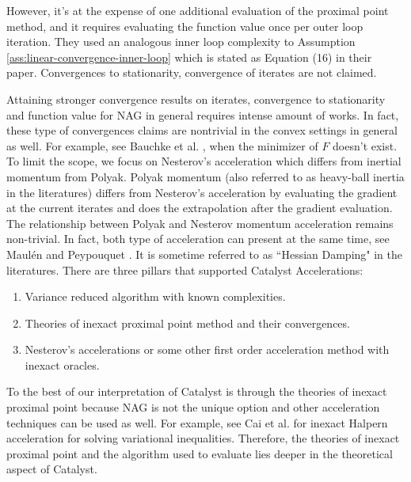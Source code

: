\documentclass[12pt]{article}
\begin{document}
            However, it's at the expense of one additional evaluation of the proximal point method, and it requires evaluating the function value once per outer loop iteration. 
            They used an analogous inner loop complexity to Assumption \ref{ass:linear-convergence-inner-loop} which is stated as Equation (16) in their paper. 
            Convergences to stationarity, convergence of iterates are not claimed. 
            \par
            Attaining stronger convergence results on iterates, convergence to stationarity and function value for NAG in general requires intense amount of works. 
            In fact, these type of convergences claims are nontrivial in the convex settings in general as well. 
            For example, see Bauchke et al. \cite{bauschke_applying_2020}, when the minimizer of $F$ doesn't exist. 
            To limit the scope, we focus on Nesterov's acceleration which differs from inertial momentum from Polyak.
            Polyak momentum (also referred to as heavy-ball inertia in the literatures) differs from Nesterov's acceleration by evaluating the gradient at the current iterates and does the extrapolation after the gradient evaluation. 
            The relationship between Polyak and Nesterov momentum acceleration remains non-trivial. 
            In fact, both type of acceleration can present at the same time, see Maulén and Peypouquet \cite{maulen_speed_2023}.
            It is sometime referred to as ``Hessian Damping" in the literatures.  
            There are three pillars that supported Catalyst Accelerations: 
            \begin{enumerate}
                \item Variance reduced algorithm with known complexities. 
                \item Theories of inexact proximal point method and their convergences. 
                \item Nesterov's accelerations or some other first order acceleration method with inexact oracles. 
            \end{enumerate}
            To the best of our interpretation of Catalyst is through the theories of inexact proximal point because NAG is not the unique option and other acceleration techniques can be used as well. 
            For example, see Cai et al. \cite{cai_variance_2023} for inexact Halpern acceleration for solving variational inequalities. 
            Therefore, the theories of inexact proximal point and the algorithm used to evaluate lies deeper in the theoretical aspect of Catalyst. 
\end{document}
